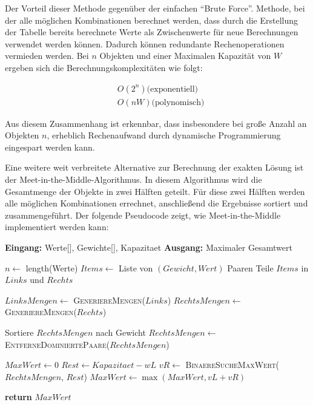 Der Vorteil dieser Methode gegenüber der einfachen \enquote{Brute Force}. Methode, bei der alle möglichen Kombinationen berechnet werden, dass durch die Erstellung der Tabelle bereits berechnete Werte als Zwischenwerte für neue Berechnungen verwendet werden können. Dadurch können redundante Rechenoperationen vermieden werden. Bei $ n $ Objekten und einer Maximalen Kapazität von $ W $ ergeben sich die Berechnungskomplexitäten wie folgt: 

\begin{align}
    & O(2^n) \text{(exponentiell)} \\
    & O(nW) \text{(polynomisch)}
\end{align}

Aus diesem Zusammenhang ist erkennbar, dass insbesondere bei große Anzahl an Objekten $ n $, erheblich Rechenaufwand durch dynamische Programmierung eingespart werden kann. 

Eine weitere weit verbreitete Alternative zur Berechnung der exakten Lösung ist der Meet-in-the-Middle-Algorithmus. In diesem Algorithmus wird die Gesamtmenge der Objekte in zwei Hälften geteilt. Für diese zwei Hälften werden alle möglichen Kombinationen errechnet, anschließend die Ergebnisse sortiert und zusammengeführt. Der folgende Pseudocode zeigt, wie Meet-in-the-Middle implementiert werden kann:

\begin{algorithmic}
    \State \textbf{Eingang:} Werte[], Gewichte[], Kapazitaet
    \State \textbf{Ausgang:} Maximaler Gesamtwert

    \State $n \leftarrow$ length(Werte)
    \State $Items \leftarrow$ Liste von $(Gewicht, Wert)$ Paaren
    \State Teile $Items$ in $Links$ und $Rechts$

    \State $LinksMengen \leftarrow$ \textsc{GeneriereMengen}($Links$)
    \State $RechtsMengen \leftarrow$ \textsc{GeneriereMengen}($Rechts$)

    \State Sortiere $RechtsMengen$ nach Gewicht
    \State $RechtsMengen \leftarrow$ \textsc{EntferneDominiertePaare}($RechtsMengen$)

    \State $MaxWert \leftarrow 0$
            \State $Rest \leftarrow Kapazitaet - wL$
            \State $vR \leftarrow$ \textsc{BinaereSucheMaxWert}($RechtsMengen$, $Rest$)
            \State $MaxWert \leftarrow \max(MaxWert, vL + vR)$
        \EndIf
    \EndFor

    \State \textbf{return} $MaxWert$

\end{algorithmic}

